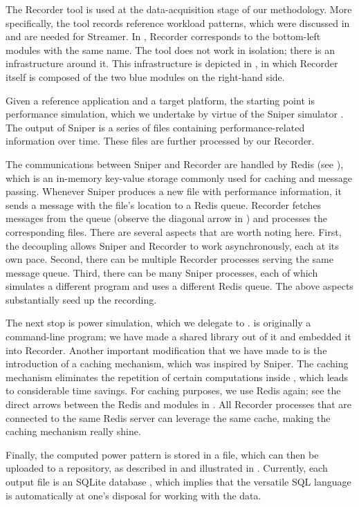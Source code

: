 
The Recorder tool is used at the data-acquisition stage of our methodology. More
specifically, the tool records reference workload patterns, which were discussed
in  and are needed for Streamer. In , Recorder
corresponds to the bottom-left modules with the same name. The tool does not
work in isolation; there is an infrastructure around it. This infrastructure is
depicted in , in which Recorder itself is composed of the two
blue modules on the right-hand side.

Given a reference application and a target platform, the starting point is
performance simulation, which we undertake by virtue of the Sniper simulator
\cite{carlson2011}. The output of Sniper is a series of files containing
performance-related information over time. These files are further processed by
our Recorder.

The communications between Sniper and Recorder are handled by Redis \cite{redis}
(see ), which is an in-memory key-value storage commonly used for
caching and message passing. Whenever Sniper produces a new file with
performance information, it sends a message with the file's location to a Redis
queue. Recorder fetches messages from the queue (observe the diagonal arrow in
) and processes the corresponding files. There are several
aspects that are worth noting here. First, the decoupling allows Sniper and
Recorder to work asynchronously, each at its own pace. Second, there can be
multiple Recorder processes serving the same message queue. Third, there can be
many Sniper processes, each of which simulates a different program and uses a
different Redis queue. The above aspects substantially seed up the recording.

The next stop is power simulation, which we delegate to 
\cite{li2009}.  is originally a command-line program; we have made a
shared library out of it and embedded it into Recorder. Another important
modification that we have made to  is the introduction of a caching
mechanism, which was inspired by Sniper. The caching mechanism eliminates the
repetition of certain computations inside , which leads to
considerable time savings. For caching purposes, we use Redis again; see the
direct arrows between the Redis and  modules in . All
Recorder processes that are connected to the same Redis server can leverage the
same cache, making the caching mechanism really shine.

Finally, the computed power pattern is stored in a file, which can then be
uploaded to a repository, as described in  and illustrated in
. Currently, each output file is an SQLite database
\cite{sqlite}, which implies that the versatile SQL language is automatically at
one's disposal for working with the data.
